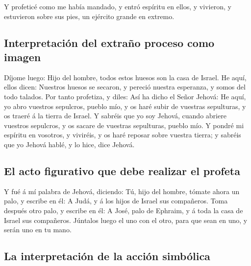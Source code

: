  Y profeticé como me había mandado, y entró espíritu en
ellos, y vivieron, y estuvieron sobre sus pies, un ejército grande en
extremo.

\hypertarget{interpretaciuxf3n-del-extrauxf1o-proceso-como-imagen}{%
\subsection{Interpretación del extraño proceso como
imagen}\label{interpretaciuxf3n-del-extrauxf1o-proceso-como-imagen}}

 Díjome luego: Hijo del hombre, todos estos huesos son la
casa de Israel. He aquí, ellos dicen: Nuestros huesos se secaron, y
pereció nuestra esperanza, y somos del todo talados.  Por
tanto profetiza, y diles: Así ha dicho el Señor Jehová: He aquí, yo abro
vuestros sepulcros, pueblo mío, y os haré subir de vuestras sepulturas,
y os traeré á la tierra de Israel.  Y sabréis que yo soy
Jehová, cuando abriere vuestros sepulcros, y os sacare de vuestras
sepulturas, pueblo mío.  Y pondré mi espíritu en vosotros,
y viviréis, y os haré reposar sobre vuestra tierra; y sabréis que yo
Jehová hablé, y lo hice, dice Jehová.

\hypertarget{el-acto-figurativo-que-debe-realizar-el-profeta}{%
\subsection{El acto figurativo que debe realizar el
profeta}\label{el-acto-figurativo-que-debe-realizar-el-profeta}}

 Y fué á mí palabra de Jehová, diciendo:  Tú,
hijo del hombre, tómate ahora un palo, y escribe en él: A Judá, y á los
hijos de Israel sus compañeros. Toma después otro palo, y escribe en él:
A José, palo de Ephraim, y á toda la casa de Israel sus compañeros.
 Júntalos luego el uno con el otro, para que sean en uno, y
serán uno en tu mano.

\hypertarget{la-interpretaciuxf3n-de-la-acciuxf3n-simbuxf3lica}{%
\subsection{La interpretación de la acción
simbólica}\label{la-interpretaciuxf3n-de-la-acciuxf3n-simbuxf3lica}}

